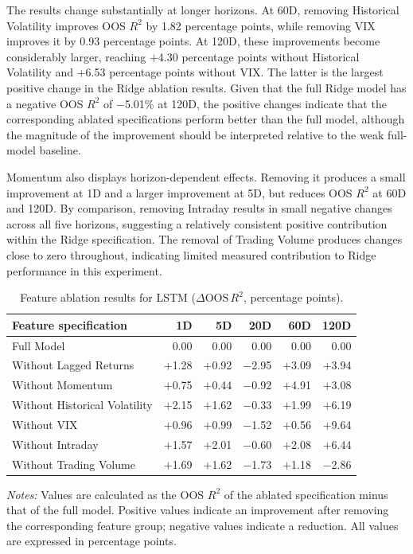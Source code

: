 \documentclass[12pt,twoside]{ord}
\begin{document}
The results change substantially at longer horizons. At 60D, removing Historical Volatility improves OOS $R^2$ by 1.82 percentage points, while removing VIX improves it by 0.93 percentage points. At 120D, these improvements become considerably larger, reaching $+$4.30 percentage points without Historical Volatility and $+$6.53 percentage points without VIX. The latter is the largest positive change in the Ridge ablation results. Given that the full Ridge model has a negative OOS $R^2$ of $-$5.01\% at 120D, the positive changes indicate that the corresponding ablated specifications perform better than the full model, although the magnitude of the improvement should be interpreted relative to the weak full-model baseline.

Momentum also displays horizon-dependent effects. Removing it produces a small improvement at 1D and a larger improvement at 5D, but reduces OOS $R^2$ at 60D and 120D. By comparison, removing Intraday results in small negative changes across all five horizons, suggesting a relatively consistent positive contribution within the Ridge specification. The removal of Trading Volume produces changes close to zero throughout, indicating limited measured contribution to Ridge performance in this experiment.

\begin{table}[htbp]
\centering
\caption{Feature ablation results for LSTM ($\Delta \mathrm{OOS}\,R^2$, percentage points).}\label{tab:ablation_lstm}
{\footnotesize
\setlength{\tabcolsep}{6pt}
\begin{tabular}{lrrrrr}
\hline
Feature specification & 1D & 5D & 20D & 60D & 120D \\
\hline
Full Model & 0.00 & 0.00 & 0.00 & 0.00 & 0.00 \\
Without Lagged Returns & $+$1.28 & $+$0.92 & $-$2.95 & $+$3.09 & $+$3.94 \\
Without Momentum & $+$0.75 & $+$0.44 & $-$0.92 & $+$4.91 & $+$3.08 \\
Without Historical Volatility & $+$2.15 & $+$1.62 & $-$0.33 & $+$1.99 & $+$6.19 \\
Without VIX & $+$0.96 & $+$0.99 & $-$1.52 & $+$0.56 & $+$9.64 \\
Without Intraday & $+$1.57 & $+$2.01 & $-$0.60 & $+$2.08 & $+$6.44 \\
Without Trading Volume & $+$1.69 & $+$1.62 & $-$1.73 & $+$1.18 & $-$2.86 \\
\hline
\end{tabular}
}
\par\vspace{4pt}\parbox{\linewidth}{\fontsize{9pt}{12pt}\selectfont\textit{Notes:} Values are calculated as the OOS $R^2$ of the ablated specification minus that of the full model. Positive values indicate an improvement after removing the corresponding feature group; negative values indicate a reduction. All values are expressed in percentage points.}
\end{table}
\end{document}
